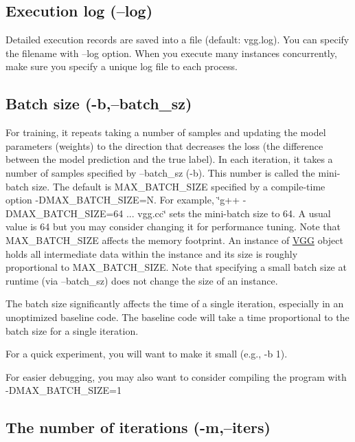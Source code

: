 \subsection*{Execution log (--log) }

Detailed execution records are saved into a file (default\+: vgg.\+log). You can specify the filename with --log option. When you execute many instances concurrently, make sure you specify a unique log file to each process.

\subsection*{Batch size (-\/b,--batch\+\_\+sz) }

For training, it repeats taking a number of samples and updating the model parameters (weights) to the direction that decreases the loss (the difference between the model prediction and the true label). In each iteration, it takes a number of samples specified by --batch\+\_\+sz (-\/b). This number is called the mini-\/batch size. The default is M\+A\+X\+\_\+\+B\+A\+T\+C\+H\+\_\+\+S\+I\+ZE specified by a compile-\/time option -\/\+D\+M\+A\+X\+\_\+\+B\+A\+T\+C\+H\+\_\+\+S\+I\+ZE=N. For example, \char`\"{}g++ -\/\+D\+M\+A\+X\+\_\+\+B\+A\+T\+C\+H\+\_\+\+S\+I\+Z\+E=64 ... vgg.\+cc\char`\"{} sets the mini-\/batch size to 64. A usual value is 64 but you may consider changing it for performance tuning. Note that M\+A\+X\+\_\+\+B\+A\+T\+C\+H\+\_\+\+S\+I\+ZE affects the memory footprint. An instance of \hyperlink{structVGG}{V\+GG} object holds all intermediate data within the instance and its size is roughly proportional to M\+A\+X\+\_\+\+B\+A\+T\+C\+H\+\_\+\+S\+I\+ZE. Note that specifying a small batch size at runtime (via --batch\+\_\+sz) does not change the size of an instance.

The batch size significantly affects the time of a single iteration, especially in an unoptimized baseline code. The baseline code will take a time proportional to the batch size for a single iteration.

For a quick experiment, you will want to make it small (e.\+g., -\/b 1).

For easier debugging, you may also want to consider compiling the program with -\/\+D\+M\+A\+X\+\_\+\+B\+A\+T\+C\+H\+\_\+\+S\+I\+ZE=1

\subsection*{The number of iterations (-\/m,--iters) }

